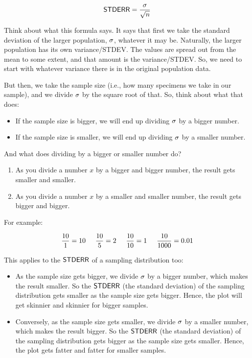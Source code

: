 \documentclass[../../../main.tex]{subfiles}
\begin{document}
\begin{equation*}
  \StdErr/ = \frac{\populationstdev}{\sqrt{\samplesize/}}
\end{equation*}

\noindent
Think about what this formula says. It says that first we take the standard deviation of the larger population, $\sigma$, whatever it may be. Naturally, the larger population has its own variance/STDEV. The values are spread out from the mean to some extent, and that amount is the variance/STDEV. So, we need to start with whatever variance there is in the original population data.

But then, we take the sample size (i.e., how many specimens we take in our sample), and we divide $\sigma$ by the square root of that. So, think about what that does:

\begin{itemize}
  \item If the sample size is bigger, we will end up dividing $\sigma$ by a bigger number.
  \item If the sample size is smaller, we will end up dividing $\sigma$ by a smaller number.
\end{itemize}

\noindent
And what does dividing by a bigger or smaller number do? 

\begin{enumerate}
  \item As you divide a number $x$ by a bigger and bigger number, the result gets smaller and smaller. 
  \item As you divide a number $x$ by a smaller and smaller number, the result gets bigger and bigger.
\end{enumerate}

\noindent
For example:

\begin{equation*}
  \frac{10}{1} = 10 \hskip 0.5cm \frac{10}{5} = 2 \hskip 0.5cm \frac{10}{10} = 1 \hskip 0.5cm \frac{10}{1000} = 0.01
\end{equation*}

\noindent
This applies to the $\StdErr/$ of a sampling distribution too:

\begin{itemize}

  \item As the sample size gets bigger, we divide $\sigma$ by a bigger number, which makes the result smaller. So the $\StdErr/$ (the standard deviation) of the sampling distribution gets smaller as the sample size gets bigger. Hence, the plot will get skinnier and skinnier for bigger samples.
  
  \item Conversely, as the sample size gets smaller, we divide $\sigma$ by a smaller number, which makes the result bigger. So the $\StdErr/$ (the standard deviation) of the sampling distribution gets bigger as the sample size gets smaller. Hence, the plot gets fatter and fatter for smaller samples.

\end{itemize}
\end{document}

